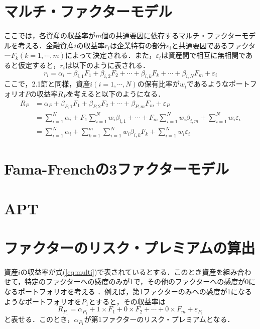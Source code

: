 \documentclass[11pt]{jreport}
\begin{document}
\section{マルチ・ファクターモデル}
ここでは，各資産の収益率が$m$個の共通要因に依存するマルチ・ファクターモデルを考える．金融資産$i$の収益率$r_i$は企業特有の部分$\varepsilon_i$と共通要因であるファクター$F_k(k=1,\cdots,m)$によって決定される．また，$\varepsilon_i$は資産間で相互に無相関であると仮定すると，$r_i$は以下のように表される．
\begin{equation}
r_i = \alpha_i + \beta_{i,1}F_1 + \beta_{i,2}F_2 + \cdots + \beta_{i,k}F_k + \cdots + \beta_{i,N}F_m + \varepsilon_i
\end{equation}
ここで，2.1節と同様，資産$i(i=1,\cdots,N)$の保有比率が$w_i$であるようなポートフォリオ$P$の収益率$R_P$を考えると以下のようになる．
\begin{equation}
\begin{split}
R_P &= \alpha_P + \beta_{P,1} F_1 + \beta_{P,2} F_2 + \cdots + \beta_{P,m} F_m + \varepsilon_P\\
&=\sum_{i=1}^N \alpha_i + F_1 \sum_{i=1}^N w_i \beta_{i,1} + \cdots + F_m \sum_{i=1}^N w_i \beta_{i,m} + \sum_{i=1}^N w_i\varepsilon_i\\
&= \sum_{i=1}^N \alpha_i + \sum_{k=1}^m \sum_{i=1}^N w_i \beta_{i,k} F_k + \sum_{i=1}^N w_i\varepsilon_i
\label{eq:multi}
\end{split}
\end{equation}

\section{Fama-Frenchの3ファクターモデル}
\section{APT}
\section{ファクターのリスク・プレミアムの算出}
資産$i$の収益率が式(\ref{eq:multi})で表されているとする．このとき資産を組み合わせて，特定のファクターへの感度のみが1で，その他のファクターへの感度が0になるポートフォリオを考える ．例えば，第1ファクターのみへの感度が1になるようなポートフォリオを$P_1$とすると，その収益率は
\begin{equation}
R_{P_1} = \alpha_{P_1} + 1\times F_1 + 0\times F_2 + \cdots + 0\times F_m + \varepsilon_{P_1} 
\end{equation}
と表せる．このとき，$\alpha_{P_1}$が第1ファクターのリスク・プレミアムとなる．
\end{document}
